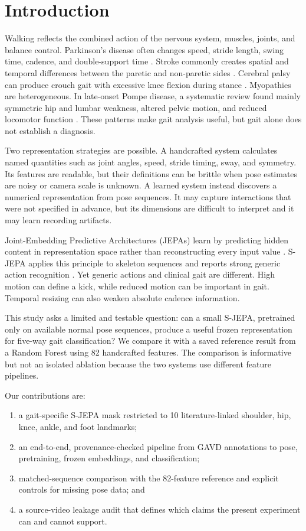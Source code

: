 \documentclass[conference]{IEEEtran}
\begin{document}
\section{Introduction}
Walking reflects the combined action of the nervous system, muscles, joints, and balance control. Parkinson's disease often changes speed, stride length, swing time, cadence, and double-support time \cite{zanardi2021parkinsons}. Stroke commonly creates spatial and temporal differences between the paretic and non-paretic sides \cite{lauziere2014stroke}. Cerebral palsy can produce crouch gait with excessive knee flexion during stance \cite{pandey2023crouch}. Myopathies are heterogeneous. In late-onset Pompe disease, a systematic review found mainly symmetric hip and lumbar weakness, altered pelvic motion, and reduced locomotor function \cite{maulet2023myopathy}. These patterns make gait analysis useful, but gait alone does not establish a diagnosis.

Two representation strategies are possible. A handcrafted system calculates named quantities such as joint angles, speed, stride timing, sway, and symmetry. Its features are readable, but their definitions can be brittle when pose estimates are noisy or camera scale is unknown. A learned system instead discovers a numerical representation from pose sequences. It may capture interactions that were not specified in advance, but its dimensions are difficult to interpret and it may learn recording artifacts.

Joint-Embedding Predictive Architectures (JEPAs) learn by predicting hidden content in representation space rather than reconstructing every input value \cite{assran2023ijepa}. S-JEPA applies this principle to skeleton sequences and reports strong generic action recognition \cite{abdelfattah2024sjepa}. Yet generic actions and clinical gait are different. High motion can define a kick, while reduced motion can be important in gait. Temporal resizing can also weaken absolute cadence information.

This study asks a limited and testable question: can a small S-JEPA, pretrained only on available normal pose sequences, produce a useful frozen representation for five-way gait classification? We compare it with a saved reference result from a Random Forest using 82 handcrafted features. The comparison is informative but not an isolated ablation because the two systems use different feature pipelines.

Our contributions are:
\begin{enumerate}
    \item a gait-specific S-JEPA mask restricted to 10 literature-linked shoulder, hip, knee, ankle, and foot landmarks;
    \item an end-to-end, provenance-checked pipeline from GAVD annotations to pose, pretraining, frozen embeddings, and classification;
    \item matched-sequence comparison with the 82-feature reference and explicit controls for missing pose data; and
    \item a source-video leakage audit that defines which claims the present experiment can and cannot support.
\end{enumerate}
\end{document}
